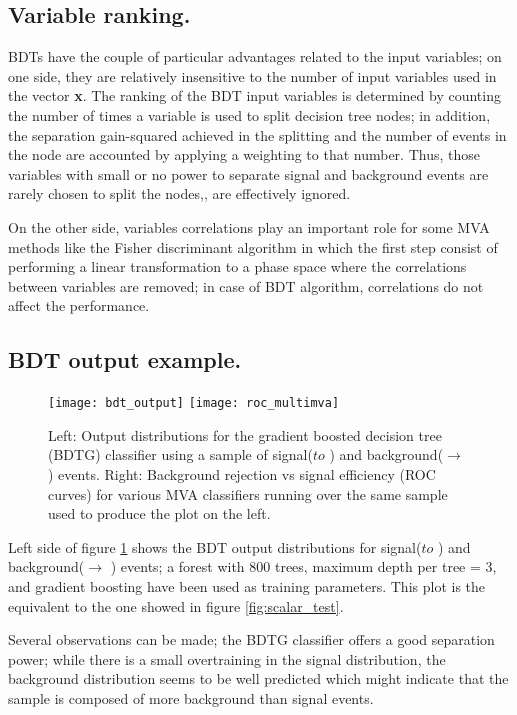 \subsection{Variable ranking.}

BDTs have the couple of particular advantages related to the input variables; on one side, they are relatively insensitive to the number of input variables used in the vector \textbf{x}. The ranking of the BDT input variables is determined by counting the number of times a variable is used to split decision tree nodes; in addition, the separation gain-squared achieved in the splitting and the number of events in the node are accounted by applying a weighting to that number. Thus, those variables with small or no power to separate signal and background events are rarely chosen to split the nodes,\ie, are effectively ignored.

On the other side, variables correlations play an important role for some MVA methods like the Fisher discriminant algorithm in which the first step consist of performing a linear transformation to a phase space where the correlations between variables are removed; in case of BDT algorithm, correlations do not affect the performance.

\subsection{BDT output example.}

\begin{figure}[!h]
  \centering
  \texttt{[image: bdt\_output]}
  \texttt{[image: roc\_multimva]}
  \caption[BDT output example.]{Left: Output distributions for the gradient boosted decision tree (BDTG) classifier using a sample of signal(\pp $to$ \tHq ) and background(\pp $\to$ \ttbar) events. Right: Background rejection vs signal efficiency (ROC curves) for various MVA classifiers running over the same sample used to produce the plot on the left.}\label{fig:bdt_output}
\end{figure}


Left side of figure \ref{fig:bdt_output} shows the BDT output distributions for signal(\pp $to$ \tHq ) and background(\pp $\to$ \ttbar) events; a forest with 800 trees, maximum depth per tree = 3, and gradient boosting have been used as training parameters. This plot is the equivalent to the one showed in figure \ref{fig:scalar_test}.

Several observations can be made; the BDTG classifier offers a good separation power; while there is a small overtraining in the signal distribution, the background distribution seems to be well predicted which might indicate that the sample is composed of more background than signal events.

